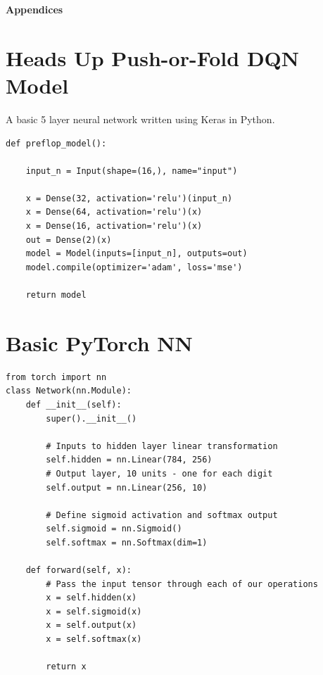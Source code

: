 \documentclass[12pt]{article}
\begin{document}
\newpage
\begin{flushleft}
\nocite{*}


\end{flushleft}

\bigskip
\Large{\textbf{Appendices}}
\appendix
\section{Heads Up Push-or-Fold DQN Model}
\label{dqnmodel}
\normalsize
A basic 5 layer neural network written using Keras in Python.
\begin{verbatim}
def preflop_model():

    input_n = Input(shape=(16,), name="input")

    x = Dense(32, activation='relu')(input_n)
    x = Dense(64, activation='relu')(x)
    x = Dense(16, activation='relu')(x)
    out = Dense(2)(x)
    model = Model(inputs=[input_n], outputs=out)
    model.compile(optimizer='adam', loss='mse')

    return model
\end{verbatim}

\section{Basic PyTorch NN}
\begin{verbatim}
from torch import nn
class Network(nn.Module):
    def __init__(self):
        super().__init__()
        
        # Inputs to hidden layer linear transformation
        self.hidden = nn.Linear(784, 256)
        # Output layer, 10 units - one for each digit
        self.output = nn.Linear(256, 10)
        
        # Define sigmoid activation and softmax output 
        self.sigmoid = nn.Sigmoid()
        self.softmax = nn.Softmax(dim=1)
        
    def forward(self, x):
        # Pass the input tensor through each of our operations
        x = self.hidden(x)
        x = self.sigmoid(x)
        x = self.output(x)
        x = self.softmax(x)
        
        return x
\end{verbatim}
\end{document}
